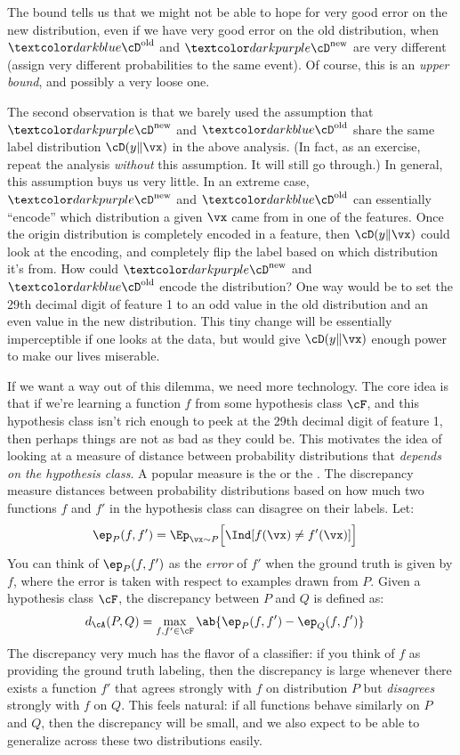 The bound tells us that we might not be able to hope for very good error on the new distribution, even if we have very good error on the old distribution, when $\Dold$ and $\Dnew$ are very different (assign very different probabilities to the same event).
Of course, this is an \emph{upper bound}, and possibly a very loose one.

The second observation is that we barely used the assumption that $\Dnew$ and $\Dold$ share the same label distribution $\cD(y \| \vx)$ in the above analysis. (In fact, as an exercise, repeat the analysis \emph{without} this assumption. It will still go through.)
In general, this assumption buys us very little.
In an extreme case, $\Dnew$ and $\Dold$ can essentially ``encode'' which distribution a given $\vx$ came from in one of the features.
Once the origin distribution is completely encoded in a feature, then $\cD(y \| \vx)$ could look at the encoding, and completely flip the label based on which distribution it's from.
How could $\Dnew$ and $\Dold$ encode the distribution?
One way would be to set the 29th decimal digit of feature 1 to an odd value in the old distribution and an even value in the new distribution.
This tiny change will be essentially imperceptible if one looks at the data, but would give $\cD(y \| \vx)$ enough power to make our lives miserable.

If we want a way out of this dilemma, we need more technology.
The core idea is that if we're learning a function $f$ from some hypothesis class $\cF$, and this hypothesis class isn't rich enough to peek at the 29th decimal digit of feature 1, then perhaps things are not as bad as they could be.
This motivates the idea of looking at a measure of distance between probability distributions that \emph{depends on the hypothesis class}.
A popular measure is the  or the .
The discrepancy measure distances between probability distributions based on how much two functions $f$ and $f'$ in the hypothesis class can disagree on their labels.
Let:
%
\begin{align}
  \ep_P(f,f')
  &= \Ep_{\vx \sim P} \Big[ \Ind[ f(\vx) \neq f'(\vx) ] \Big]
\end{align}
%
You can think of $\ep_P(f,f')$ as the \emph{error} of $f'$ when the ground truth is given by $f$, where the error is taken with respect to examples drawn from $P$.
Given a hypothesis class $\cF$, the discrepancy between $P$ and $Q$ is defined as:
%
\begin{align}
  d_\cA(P,Q)
  &= \max_{f,f' \in \cF} \ab{ \ep_P(f,f') - \ep_Q(f,f') }
\end{align}
%
The discrepancy very much has the flavor of a classifier: if you think of $f$ as providing the ground truth labeling, then the discrepancy is large whenever there exists a function $f'$ that agrees strongly with $f$ on distribution $P$ but \emph{disagrees} strongly with $f$ on $Q$.
This feels natural: if all functions behave similarly on $P$ and $Q$, then the discrepancy will be small, and we also expect to be able to generalize across these two distributions easily.

